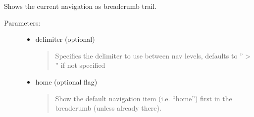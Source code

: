 \documentclass[letterpaper,10pt,english]{sphinxmanual}
\begin{document}
\begin{fulllineitems}
\begin{fulllineitems}
\end{fulllineitems}



\begin{fulllineitems}
\end{fulllineitems}


\begin{fulllineitems}
\label{knop_nav:knop_nav.pathmap}
\end{fulllineitems}



\begin{fulllineitems}
\end{fulllineitems}


\begin{fulllineitems}
\label{knop_nav:knop_nav.renderbreadcrumb}
\end{fulllineitems}


\begin{fulllineitems}
Shows the current navigation as breadcrumb trail.
\begin{description}
\item[{Parameters:}] \leavevmode\begin{itemize}
\item {} 
delimiter (optional)
\begin{quote}

Specifies the delimiter to use between nav levels, defaults to '' \textgreater{} '' if not specified
\end{quote}

\item {} 
home (optional flag)
\begin{quote}

Show the default navigation item (i.e. ``home'') first in the breadcrumb (unless already there).
\end{quote}


\end{itemize}
\end{description}
\end{fulllineitems}
\end{fulllineitems}
\end{document}

